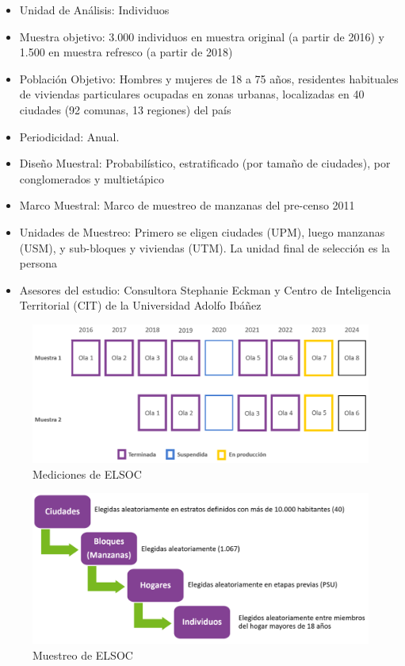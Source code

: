 \documentclass[
  12pt,
]{book}
\providecommand{\tightlist}{%
  \setlength{\itemsep}{0pt}\setlength{\parskip}{0pt}}
\begin{document}
\begin{itemize}
\tightlist
\item
  Unidad de Análisis: Individuos
\item
  Muestra objetivo: 3.000 individuos en muestra original (a partir de 2016) y 1.500 en muestra refresco (a partir de 2018)
\item
  Población Objetivo: Hombres y mujeres de 18 a 75 años, residentes habituales de viviendas particulares ocupadas en zonas urbanas, localizadas en 40 ciudades (92 comunas, 13 regiones) del país
\item
  Periodicidad: Anual.
\item
  Diseño Muestral: Probabilístico, estratificado (por tamaño de ciudades), por conglomerados y multietápico
\item
  Marco Muestral: Marco de muestreo de manzanas del pre-censo 2011
\item
  Unidades de Muestreo: Primero se eligen ciudades (UPM), luego manzanas (USM), y sub-bloques y viviendas (UTM). La unidad final de selección es la persona
\item
  Asesores del estudio: Consultora Stephanie Eckman y Centro de Inteligencia Territorial (CIT) de la Universidad Adolfo Ibáñez
\end{itemize}

\begin{figure}

{\centering \includegraphics[width=1\linewidth,height=1\textheight]{imagenes/olas_elsoc} 

}

\caption{Mediciones de ELSOC}\label{fig:ilust-olas-elsoc}
\end{figure}

\begin{figure}

{\centering \includegraphics[width=1\linewidth,height=1\textheight]{imagenes/etapas_seleccion} 

}

\caption{Muestreo de ELSOC}\label{fig:ilust-etapas-seleccion}
\end{figure}
\end{document}

